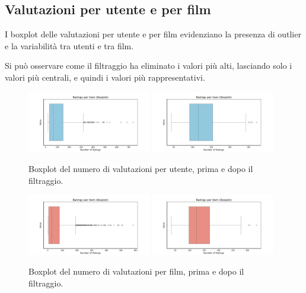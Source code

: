 \subsection{Valutazioni per utente e per film}
I boxplot delle valutazioni per utente e per film evidenziano la presenza di outlier e la variabilità tra utenti e tra film.

Si può osservare come il filtraggio ha eliminato i valori più alti, lasciando solo i valori più centrali, e quindi i valori più rappresentativi.

\begin{figure}[H]
    \centering
    \includegraphics[width=0.48\textwidth]{../output/eda/before_cut/before_ratings_per_user_box.png}
    \includegraphics[width=0.48\textwidth]{../output/eda/after_cut/after_ratings_per_user_box.png}
    \caption{Boxplot del numero di valutazioni per utente, prima e dopo il filtraggio.}
\end{figure}

\begin{figure}[H]
    \centering
    \includegraphics[width=0.48\textwidth]{../output/eda/before_cut/before_ratings_per_item_box.png}
    \includegraphics[width=0.48\textwidth]{../output/eda/after_cut/after_ratings_per_item_box.png}
    \caption{Boxplot del numero di valutazioni per film, prima e dopo il filtraggio.}
\end{figure}

